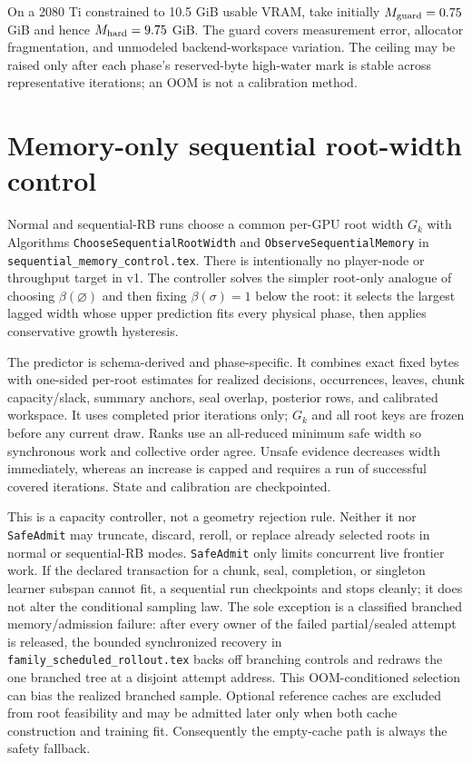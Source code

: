 \documentclass[10pt,a4paper]{article}
\newcommand{\Obj}[1]{\texttt{#1}}
\begin{document}
On a 2080 Ti constrained to 10.5 GiB usable VRAM, take initially
$M_{\rm guard}=0.75$ GiB and hence $M_{\rm hard}=9.75$ GiB.  The guard covers
measurement error, allocator fragmentation, and unmodeled backend-workspace
variation.  The ceiling may be raised only after
each phase's reserved-byte high-water mark is stable across representative
iterations; an OOM is not a calibration method.

\section{Memory-only sequential root-width control}

Normal and sequential-RB runs choose a common per-GPU root width $G_k$ with
Algorithms \Obj{ChooseSequentialRootWidth} and
\Obj{ObserveSequentialMemory} in
\texttt{sequential\_memory\_control.tex}.  There is intentionally no
player-node or throughput target in v1.  The controller solves the simpler
root-only analogue of choosing $\beta(\varnothing)$ and then fixing
$\beta(\sigma)=1$ below the root: it selects the largest lagged width whose
upper prediction fits every physical phase, then applies conservative growth
hysteresis.

The predictor is schema-derived and phase-specific.  It combines exact fixed
bytes with one-sided per-root estimates for realized decisions, occurrences,
leaves, chunk capacity/slack, summary anchors, seal overlap, posterior rows,
and calibrated workspace.  It uses completed prior iterations only; $G_k$ and
all root keys are frozen before any current draw.  Ranks use an all-reduced
minimum safe width so synchronous work and collective order agree.  Unsafe
evidence decreases width immediately, whereas an increase is capped and
requires a run of successful covered iterations.  State and calibration are
checkpointed.

This is a capacity controller, not a geometry rejection rule.  Neither it nor
\Obj{SafeAdmit} may truncate, discard, reroll, or replace already selected
roots in normal or sequential-RB modes.  \Obj{SafeAdmit} only limits concurrent
live frontier work.  If the declared transaction for a chunk, seal, completion,
or singleton learner subspan cannot fit, a sequential run checkpoints and
stops cleanly; it does not alter the conditional sampling law.  The sole
exception is a classified branched memory/admission failure: after every owner
of the failed partial/sealed attempt is released, the bounded synchronized
recovery in \texttt{family\_scheduled\_rollout.tex} backs off branching
controls and redraws the one branched tree at a disjoint attempt address.  This
OOM-conditioned selection can bias the realized branched sample.  Optional
reference caches are excluded from root feasibility and may be admitted later
only when both cache construction and training fit.  Consequently the
empty-cache path is always the safety fallback.
\end{document}
